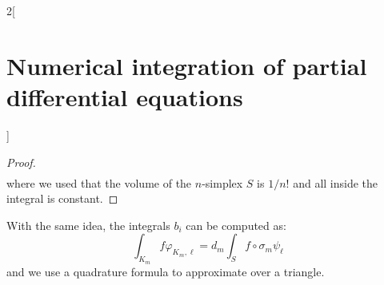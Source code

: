 \documentclass[../../../main_math.tex]{subfiles}
\begin{document}
\begin{multicols}{2}[\section{Numerical integration of partial differential equations}]
\begin{proof}
\begin{align*}
    \end{align*}
    where we used that the volume of the $n$-simplex $S$ is $1/n!$ and all inside the integral is constant.
  \end{proof}
  \begin{remark}
    With the same idea, the integrals $b_i$ can be computed as:
    $$
      \int_{K_m}f\varphi_{K_m,\ell}=d_m\int_Sf\circ\sigma_m\psi_\ell
    $$
    and we use a quadrature formula to approximate over a triangle.
  \end{remark}
\end{multicols}
\end{document}
